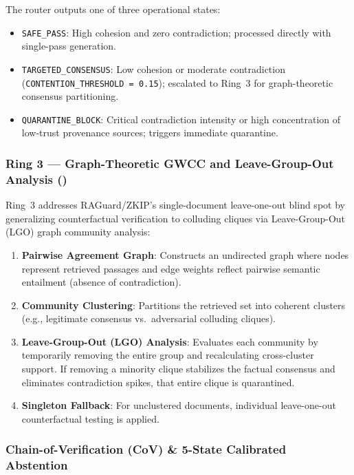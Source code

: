 The router outputs one of three operational states:
\begin{itemize}
\item \texttt{SAFE\_PASS}: High cohesion and zero contradiction; processed
  directly with single-pass generation.
\item \texttt{TARGETED\_CONSENSUS}: Low cohesion or moderate contradiction
  (\texttt{CONTENTION\_THRESHOLD = 0.15}); escalated to Ring~3 for
  graph-theoretic consensus partitioning.
\item \texttt{QUARANTINE\_BLOCK}: Critical contradiction intensity or high
  concentration of low-trust provenance sources; triggers immediate
  quarantine.
\end{itemize}

\subsubsection{Ring 3 --- Graph-Theoretic GWCC and Leave-Group-Out Analysis ()}
\label{sec:ring3}

Ring~3 addresses RAGuard/ZKIP's single-document leave-one-out blind spot
by generalizing counterfactual verification to colluding cliques via
Leave-Group-Out (LGO) graph community analysis:

\begin{enumerate}
\item \textbf{Pairwise Agreement Graph}: Constructs an undirected graph
  where nodes represent retrieved passages and edge weights reflect pairwise
  semantic entailment (absence of contradiction).
\item \textbf{Community Clustering}: Partitions the retrieved set into
  coherent clusters (e.g., legitimate consensus vs.\ adversarial colluding
  cliques).
\item \textbf{Leave-Group-Out (LGO) Analysis}: Evaluates each community by
  temporarily removing the entire group and recalculating cross-cluster
  support. If removing a minority clique stabilizes the factual consensus
  and eliminates contradiction spikes, that entire clique is quarantined.
\item \textbf{Singleton Fallback}: For unclustered documents, individual
  leave-one-out counterfactual testing is applied.
\end{enumerate}

\subsubsection{Chain-of-Verification (CoV) \& 5-State Calibrated Abstention}
\label{sec:cov-abstention}

